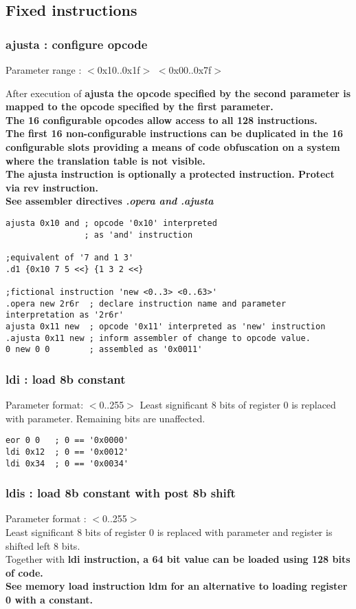 \documentclass[a4paper,11pt]{article}
\begin{document}
\subsection{Fixed instructions}

\subsubsection{ajusta : configure opcode} 
 Parameter range : $<$0x10..0x1f$>$ $<$0x00..0x7f$>$
 
 After execution of \bf ajusta \rm the opcode specified by the second parameter is mapped to the opcode specified by the first parameter. \\
 The 16 configurable opcodes allow access to all 128 instructions.\\
 The first 16 non-configurable instructions can be duplicated in the 16 configurable slots providing a means of code obfuscation on a system where the translation table is not visible.\\
 The ajusta instruction is optionally a protected instruction. Protect via \bf rev \rm instruction.\\
 See assembler directives \sl .opera \rm and \sl .ajusta \rm
 
\begin{verbatim}
ajusta 0x10 and ; opcode '0x10' interpreted 
                ; as 'and' instruction

;equivalent of '7 and 1 3'
.d1 {0x10 7 5 <<} {1 3 2 <<} 

;fictional instruction 'new <0..3> <0..63>'
.opera new 2r6r  ; declare instruction name and parameter interpretation as '2r6r'
ajusta 0x11 new  ; opcode '0x11' interpreted as 'new' instruction
.ajusta 0x11 new ; inform assembler of change to opcode value.
0 new 0 0        ; assembled as '0x0011'
\end{verbatim}

\subsubsection{ldi : load 8b constant} 
 Parameter format: $<$0..255$>$
 Least significant 8 bits of register 0 is replaced with parameter. Remaining bits are unaffected.
 
\begin{verbatim}
eor 0 0   ; 0 == '0x0000'
ldi 0x12  ; 0 == '0x0012'
ldi 0x34  ; 0 == '0x0034'
\end{verbatim}

\subsubsection{ldis : load 8b constant with post 8b shift} 
 Parameter format : $<$0..255$>$\\
 Least significant 8 bits of register 0 is replaced with parameter and register is shifted left 8 bits.\\
 Together with \bf ldi \rm instruction, a 64 bit value can be loaded using 128 bits of code.\\
 See memory load instruction \bf ldm \rm for an alternative to loading register 0 with a constant.\\
\end{document}
